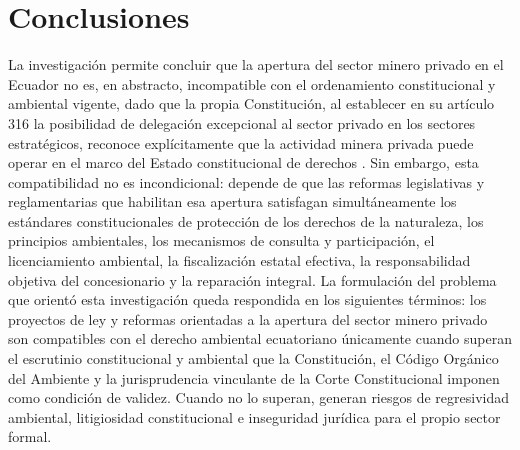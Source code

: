 
\chapter*{Conclusiones}


La investigación permite concluir que la apertura del sector minero privado en el Ecuador no es, en abstracto, incompatible con el ordenamiento constitucional y ambiental vigente, dado que la propia Constitución, al establecer en su artículo 316 la posibilidad de delegación excepcional al sector privado en los sectores estratégicos, reconoce explícitamente que la actividad minera privada puede operar en el marco del Estado constitucional de derechos \parencite{cre_2008}. Sin embargo, esta compatibilidad no es incondicional: depende de que las reformas legislativas y reglamentarias que habilitan esa apertura satisfagan simultáneamente los estándares constitucionales de protección de los derechos de la naturaleza, los principios ambientales, los mecanismos de consulta y participación, el licenciamiento ambiental, la fiscalización estatal efectiva, la responsabilidad objetiva del concesionario y la reparación integral. La formulación del problema que orientó esta investigación queda respondida en los siguientes términos: los proyectos de ley y reformas orientadas a la apertura del sector minero privado son compatibles con el derecho ambiental ecuatoriano únicamente cuando superan el escrutinio constitucional y ambiental que la Constitución, el Código Orgánico del Ambiente y la jurisprudencia vinculante de la Corte Constitucional imponen como condición de validez. Cuando no lo superan, generan riesgos de regresividad ambiental, litigiosidad constitucional e inseguridad jurídica para el propio sector formal.


